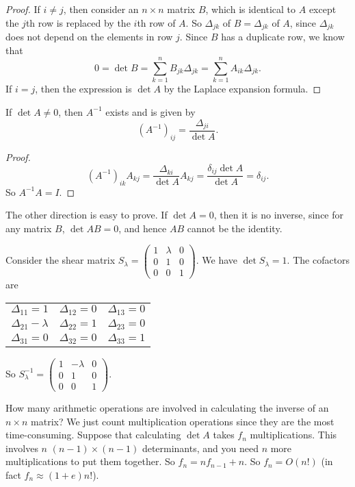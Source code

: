 \documentclass[a4paper]{article}
\begin{document}
\begin{proof}
  If $i \not= j$, then consider an $n\times n$ matrix $B$, which is identical to $A$ except the $j$th row is replaced by the $i$th row of $A$. So $\Delta_{jk}$ of $B = \Delta_{jk}$ of $A$, since $\Delta_{jk}$ does not depend on the elements in row $j$. Since $B$ has a duplicate row, we know that
  \[
    0 = \det B = \sum_{k = 1}^n B_{jk}\Delta_{jk} = \sum_{k = 1}^n A_{ik}\Delta_{jk}.
  \]
  If $i = j$, then the expression is $\det A$ by the Laplace expansion formula.
\end{proof}

\begin{thm}
  If $\det A \not =0$, then $A^{-1}$ exists and is given by
  \[
    (A^{-1})_{ij} = \frac{\Delta_{ji}}{\det A}.
  \]
\end{thm}

\begin{proof}
  \[
    (A^{-1})_{ik}A_{kj} = \frac{\Delta_{ki}}{\det A} A_{kj} = \frac{\delta_{ij}\det A}{\det A} = \delta_{ij}.
  \]
  So $A^{-1}A = I$.
\end{proof}
The other direction is easy to prove. If $\det A = 0$, then it is no inverse, since for any matrix $B$, $\det AB = 0$, and hence $AB$ cannot be the identity.

\begin{eg}
  Consider the shear matrix $S_\lambda = \begin{pmatrix} 1 & \lambda & 0 \\ 0 & 1 & 0\\ 0 & 0 & 1\end{pmatrix}$. We have $\det{S_\lambda} = 1$. The cofactors are
  \begin{center}
    \begin{tabular}{ccc}
      $\Delta_{11} = 1$ & $\Delta_{12} = 0$ & $\Delta_{13} = 0$ \\
      $\Delta_{21} - \lambda$ & $\Delta_{22} = 1$ & $\Delta_{23} = 0$ \\
      $\Delta_{31} = 0$ & $\Delta_{32} = 0$ & $\Delta_{33} = 1$
    \end{tabular}
  \end{center}
  So $S_\lambda^{-1} = \begin{pmatrix} 1 & -\lambda & 0\\ 0 & 1 & 0\\ 0 & 0 & 1\end{pmatrix}$.
\end{eg}

How many arithmetic operations are involved in calculating the inverse of an $n\times n$ matrix? We just count multiplication operations since they are the most time-consuming. Suppose that calculating $\det A$ takes $f_n$ multiplications. This involves $n$ $(n - 1)\times (n - 1)$ determinants, and you need $n$ more multiplications to put them together. So $f_n = nf_{n -1} + n$. So $f_n = O(n!)$ (in fact $f_n \approx (1 + e)n!$).
\end{document}
